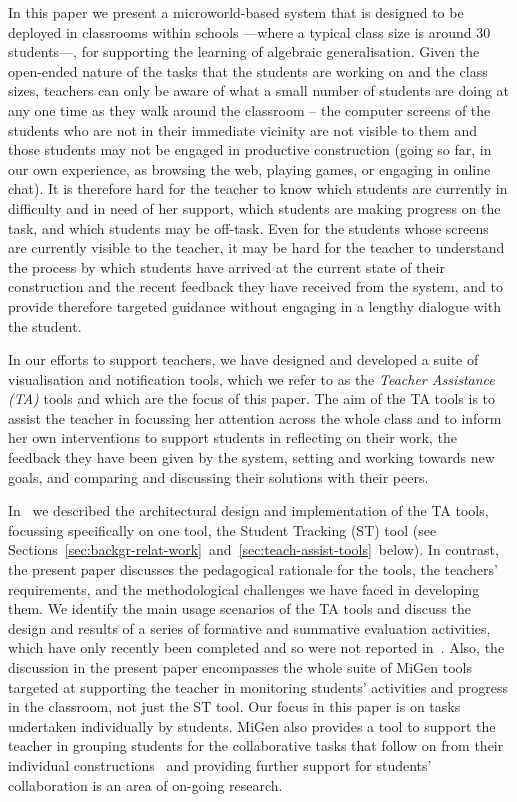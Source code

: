 In this paper we present a microworld-based system that is designed to
be deployed in classrooms within schools ---where a typical class size
is around 30 students---, for supporting the learning of algebraic
generalisation. Given the
open-ended nature of the tasks that the students are working on and
the class sizes, teachers can only be aware of what a small number of
students are doing at any one time as they walk around the classroom –
the computer screens of the students who are not in their immediate
vicinity are not visible to them and those students may not be engaged
in productive construction (going so far, in our own experience, as
browsing the web, playing games, or engaging in online chat). It is
therefore hard for the teacher to know which students are currently in
difficulty and in need of her support, which students are making
progress on the task, and which students may be off-task. Even for the
students whose screens are currently visible to the teacher, it may be
hard for the teacher to understand the process by which students have
arrived at the current state of their construction and the recent
feedback they have received from the system, and to provide therefore
targeted guidance without engaging in a lengthy dialogue with the
student.
 
In our efforts to support teachers, we have designed and developed a suite of visualisation and notification
tools, which we refer to as the {\em Teacher Assistance (TA)} tools
and which are the focus of this paper. The aim of the TA tools is to
assist the teacher in focussing her attention across the whole class and to
inform her own interventions to support students in reflecting on
their work, the feedback they have been given by the system, setting
and working towards new goals, and comparing and discussing their
solutions with their peers. 

In~\cite{ectel2010-TA,IEEE-TLT-TA} we described the architectural design
and implementation of the TA tools, focussing specifically on one
tool, the Student Tracking (ST) tool (see
Sections~\ref{sec:backgr-relat-work}~and~\ref{sec:teach-assist-tools}~below). 
In contrast, the present paper discusses the pedagogical rationale for
the tools, the teachers’ requirements, and the methodological
challenges we have faced in developing them. We identify the main
usage scenarios of the TA tools and discuss the design and results of
a series of formative and summative evaluation activities, which have
only recently been completed and so were not reported
in~\cite{ectel2010-TA,IEEE-TLT-TA}. 
Also, the discussion in the present paper
encompasses the whole suite of MiGen tools targeted at supporting the
teacher in monitoring students’ activities and progress in the
classroom, not just the ST tool.  Our focus in this paper is on tasks
undertaken individually by students. MiGen also provides a tool to
support the teacher in grouping students for the collaborative tasks
that follow on from their individual constructions~\cite{GroupingTool}
and providing further support for
students’ collaboration is an area of on-going research.
 
